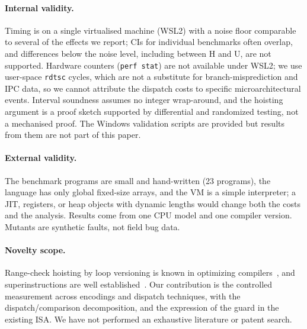 \documentclass[11pt,a4paper]{article}
\begin{document}
\paragraph{Internal validity.} Timing is on a single virtualised machine (WSL2) with a noise floor comparable to several of the effects we report; CIs for individual benchmarks often overlap, and differences below the noise level, including between H and U, are not supported. Hardware counters (\texttt{perf stat}) are not available under WSL2; we use user-space \texttt{rdtsc} cycles, which are not a substitute for branch-misprediction and IPC data, so we cannot attribute the dispatch costs to specific microarchitectural events. Interval soundness assumes no integer wrap-around, and the hoisting argument is a proof sketch supported by differential and randomized testing, not a mechanised proof. The Windows validation scripts are provided but results from them are not part of this paper.

\paragraph{External validity.} The benchmark programs are small and hand-written (23 programs), the language has only global fixed-size arrays, and the VM is a simple interpreter; a JIT, registers, or heap objects with dynamic lengths would change both the costs and the analysis. Results come from one CPU model and one compiler version. Mutants are synthetic faults, not field bug data.

\paragraph{Novelty scope.} Range-check hoisting by loop versioning is known in optimizing compilers~\cite{midkiff1998,gupta1993}, and superinstructions are well established~\cite{proebsting1995}. Our contribution is the controlled measurement across encodings and dispatch techniques, with the dispatch/comparison decomposition, and the expression of the guard in the existing ISA. We have not performed an exhaustive literature or patent search.

\end{document}
